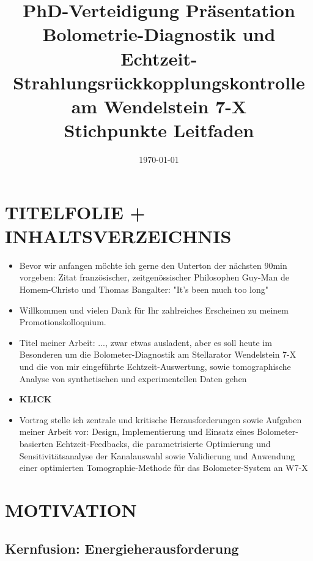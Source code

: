 \documentclass[11pt,a4paper]{article}
\title{\textbf{PhD-Verteidigung Präsentation}\\[0.5em]
\Large Bolometrie-Diagnostik und Echtzeit-Strahlungsrückkopplungskontrolle\\
am Wendelstein 7-X\\[1em]
\large Stichpunkte Leitfaden}
\author{}
\date{\today}
\begin{document}
\section{TITELFOLIE + INHALTSVERZEICHNIS}

\begin{itemize}
\item Bevor wir anfangen möchte ich gerne den Unterton der nächsten 90min vorgeben: Zitat französischer, zeitgenössischer Philosophen Guy-Man de Homem-Christo und Thomas Bangalter: "It's been much too long"
\item Willkommen und vielen Dank für Ihr zahlreiches Erscheinen zu meinem Promotionskolloquium.
\item Titel meiner Arbeit: ..., zwar etwas ausladent, aber es soll heute im Besonderen um die Bolometer-Diagnostik am Stellarator Wendelstein 7-X und die von mir eingeführte Echtzeit-Auswertung, sowie tomographische Analyse von synthetischen und experimentellen Daten gehen
\item \textbf{KLICK}
\item Vortrag stelle ich zentrale und kritische Herausforderungen sowie Aufgaben meiner Arbeit vor: Design, Implementierung und Einsatz eines Bolometer-basierten Echtzeit-Feedbacks, die parametrisierte Optimierung und Sensitivitätsanalyse der Kanalauswahl sowie Validierung und Anwendung einer optimierten Tomographie-Methode für das Bolometer-System an W7-X
\end{itemize}

\section{MOTIVATION}

\subsection{Kernfusion: Energieherausforderung}
\end{document}
